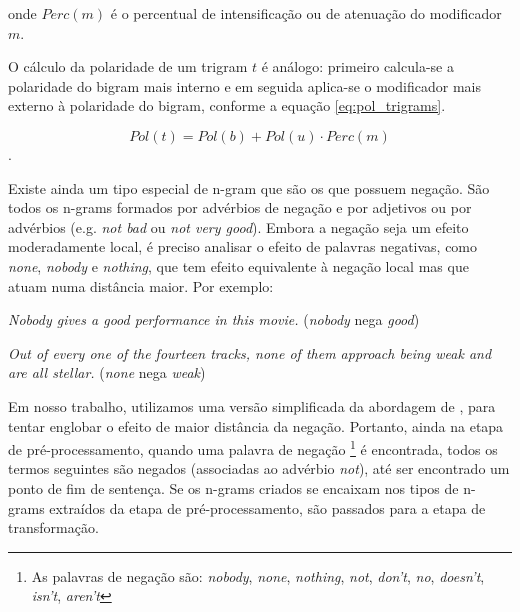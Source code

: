 onde $Perc(m)$ é o percentual de intensificação ou de atenuação do modificador $m$. 

O cálculo da polaridade de um trigram $t$ é análogo: primeiro calcula-se a polaridade do bigram mais interno e em seguida aplica-se o modificador mais externo à polaridade do bigram, conforme a equação \ref{eq:pol_trigrams}.

\begin{equation} 
Pol(t) = Pol(b) + Pol(u) \cdot Perc(m)
\label{eq:pol_trigrams}
\end{equation}.

Existe ainda um tipo especial de n-gram que são os que possuem negação. São todos os n-grams formados por advérbios de negação e por adjetivos ou por advérbios (e.g. \textit{not bad} ou \textit{not very good}). Embora a negação seja um efeito moderadamente local, é preciso analisar o efeito de palavras negativas, como \textit{none}, \textit{nobody} e \textit{nothing}, que tem efeito equivalente à negação local \cite{taboada2011lexicon} mas que atuam numa distância maior. Por exemplo:

\begin{example}
\textit{Nobody gives a good performance in this movie.} (\textit{nobody} nega \textit{good})
\label{ex:far_neg_1}
\end{example}

\begin{example}
\textit{Out of every one of the fourteen tracks, none of them approach being weak and are all stellar.} (\textit{none} nega \textit{weak})
\label{ex:far_neg_2}
\end{example}

Em nosso trabalho, utilizamos uma versão simplificada da abordagem de , para tentar englobar o efeito de maior distância da negação. Portanto, ainda na etapa de pré-processamento, quando uma palavra de negação \footnote{As palavras de negação são: \textit{nobody}, \textit{none}, \textit{nothing}, \textit{not}, \textit{don't}, \textit{no}, \textit{doesn't}, \textit{isn't}, \textit{aren't}} é encontrada, todos os termos seguintes são negados (associadas ao advérbio \textit{not}), até ser encontrado um ponto de fim de sentença. Se os n-grams criados se encaixam nos tipos de n-grams extraídos da etapa de pré-processamento, são passados para a etapa de transformação. 

